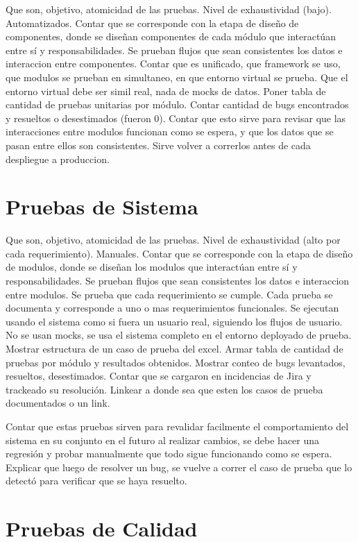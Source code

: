 Que son, objetivo, atomicidad de las pruebas. Nivel de exhaustividad (bajo). Automatizados.
Contar que se corresponde con la etapa de diseño de componentes, donde se diseñan componentes de cada módulo que interactúan entre sí y responsabilidades. Se prueban flujos que sean consistentes los datos e interaccion entre componentes.
Contar que es unificado, que framework se uso, que modulos se prueban en simultaneo, en que entorno virtual se prueba. Que el entorno virtual debe ser simil real, nada de mocks de datos.
Poner tabla de cantidad de pruebas unitarias por módulo.
Contar cantidad de bugs encontrados y resueltos o desestimados (fueron 0).
Contar que esto sirve para revisar que las interacciones entre modulos funcionan como se espera, y que los datos que se pasan entre ellos son consistentes. 
Sirve volver a correrlos antes de cada despliegue a produccion.

\section{Pruebas de Sistema}
\label{sec:system-testing}

Que son, objetivo, atomicidad de las pruebas. Nivel de exhaustividad (alto por cada requerimiento). Manuales.
Contar que se corresponde con la etapa de diseño de modulos, donde se diseñan los modulos que interactúan entre sí y responsabilidades. Se prueban flujos que sean consistentes los datos e interaccion entre modulos. Se prueba que cada requerimiento se cumple. Cada prueba se documenta y corresponde a uno o mas requerimientos funcionales.
Se ejecutan usando el sistema como si fuera un usuario real, siguiendo los flujos de usuario. No se usan mocks, se usa el sistema completo en el entorno deployado de prueba.
Mostrar estructura de un caso de prueba del excel.
Armar tabla de cantidad de pruebas por módulo y resultados obtenidos.
Mostrar conteo de bugs levantados, resueltos, desestimados. 
Contar que se cargaron en incidencias de Jira y trackeado su resolución.
Linkear a donde sea que esten los casos de prueba documentados o un link.

Contar que estas pruebas sirven para revalidar facilmente el comportamiento del sistema en su conjunto en el futuro al realizar cambios, se debe hacer una regresión y probar manualmente que todo sigue funcionando como se espera.
Explicar que luego de resolver un bug, se vuelve a correr el caso de prueba que lo detectó para verificar que se haya resuelto.

\section{Pruebas de Calidad}
\label{sec:quality-testing}

